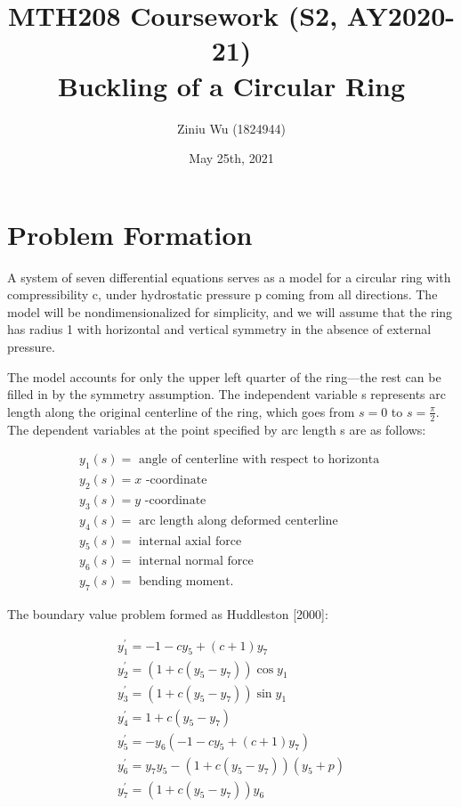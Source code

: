 \documentclass{article}
\title{MTH208 Coursework (S2, AY2020-21) \\ Buckling of a Circular Ring}
\author{Ziniu Wu (1824944)}
\date{May 25th, 2021}
\begin{document}
	
\maketitle

\section*{Problem Formation} 
A system of seven differential equations serves as a model for a circular ring with compressibility c, under hydrostatic pressure p coming from all directions. The model will be nondimensionalized for simplicity, and we will assume that the ring has radius 1 with horizontal and vertical symmetry in the absence of external pressure.

The model accounts for only the upper left quarter of the ring—the rest can be filled
in by the symmetry assumption. The independent variable s represents arc length along the
original centerline of the ring, which goes from $s = 0$ to $s = \frac{\pi}{2}$. The dependent variables
at the point specified by arc length s are as follows:

$$
\begin{array}{l}
	y_{1}(s)=\text { angle of centerline with respect to horizonta } \\ 
	y_{2}(s)=x \text { -coordinate } \\ 
	y_{3}(s)=y \text { -coordinate } \\ 
	y_{4}(s)=\text { arc length along deformed centerline } \\ 
	y_{5}(s)=\text { internal axial force } \\ 
	y_{6}(s)=\text { internal normal force } \\ 
	y_{7}(s)=\text { bending moment. }
\end{array}
$$

The boundary value problem formed as Huddleston [2000]:

$$
\begin{array}{l}
	y_{1}^{\prime}=-1-c y_{5}+(c+1) y_{7} \\
	y_{2}^{\prime}=\left(1+c\left(y_{5}-y_{7}\right)\right) \cos y_{1} \\
	y_{3}^{\prime}=\left(1+c\left(y_{5}-y_{7}\right)\right) \sin y_{1} \\
	y_{4}^{\prime}=1+c\left(y_{5}-y_{7}\right) \\
	y_{5}^{\prime}=-y_{6}\left(-1-c y_{5}+(c+1) y_{7}\right) \\
	y_{6}^{\prime}=y_{7} y_{5}-\left(1+c\left(y_{5}-y_{7}\right)\right)\left(y_{5}+p\right) \\
	y_{7}^{\prime}=\left(1+c\left(y_{5}-y_{7}\right)\right) y_{6}
\end{array}
$$
\end{document}
